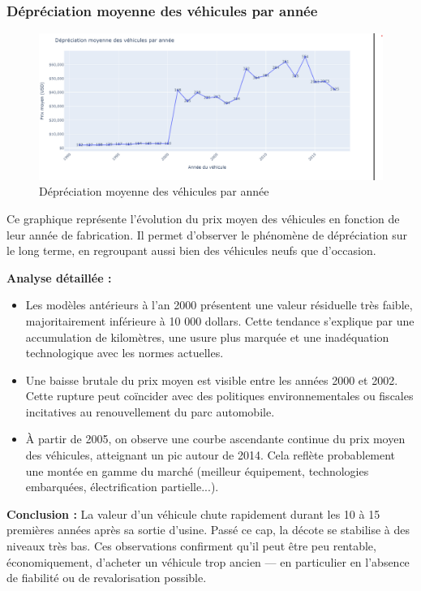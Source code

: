 \documentclass[12pt]{report}
\begin{document}
\subsubsection{ Dépréciation moyenne des véhicules par année}
\begin{figure}[H] \centering \includegraphics[width=1\textwidth]{Annee_prix.png} \caption{Dépréciation moyenne des véhicules par année} \label{fig:annee-prix} \end{figure}

Ce graphique représente l’évolution du prix moyen des véhicules en fonction de leur année de fabrication. Il permet d’observer le phénomène de dépréciation sur le long terme, en regroupant aussi bien des véhicules neufs que d’occasion.

\textbf{Analyse détaillée :} \begin{itemize} \item Les modèles antérieurs à l’an 2000 présentent une valeur résiduelle très faible, majoritairement inférieure à 10 000 dollars. Cette tendance s’explique par une accumulation de kilomètres, une usure plus marquée et une inadéquation technologique avec les normes actuelles. \item Une baisse brutale du prix moyen est visible entre les années 2000 et 2002. Cette rupture peut coïncider avec des politiques environnementales ou fiscales incitatives au renouvellement du parc automobile. \item À partir de 2005, on observe une courbe ascendante continue du prix moyen des véhicules, atteignant un pic autour de 2014. Cela reflète probablement une montée en gamme du marché (meilleur équipement, technologies embarquées, électrification partielle...). \end{itemize}

\textbf{Conclusion :}
La valeur d’un véhicule chute rapidement durant les 10 à 15 premières années après sa sortie d’usine. Passé ce cap, la décote se stabilise à des niveaux très bas. Ces observations confirment qu’il peut être peu rentable, économiquement, d’acheter un véhicule trop ancien — en particulier en l'absence de fiabilité ou de revalorisation possible.
\end{document}
